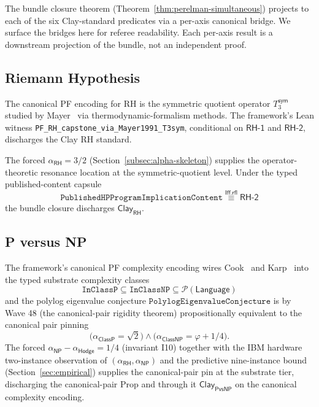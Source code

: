 \documentclass[11pt,a4paper]{amsart}
\theoremstyle{plain}
\theoremstyle{definition}
\begin{document}
The bundle closure theorem (Theorem~\ref{thm:perelman-simultaneous}) projects to each of the six Clay-standard predicates via a per-axis canonical bridge. We surface the bridges here for referee readability. Each per-axis result is a downstream projection of the bundle, not an independent proof.

\subsection{Riemann Hypothesis}\label{subsec:RH-discharge}

The canonical PF encoding for RH is the symmetric quotient operator $T_3^{\textsf{sym}}$ studied by Mayer~\cite{mayer1991} via thermodynamic-formalism methods. The framework's Lean witness \texttt{PF\_RH\_capstone\_via\_Mayer1991\_T3sym}, conditional on $\textsf{RH-1}$ and $\textsf{RH-2}$, discharges the Clay RH standard.

The forced $\alpha_{\textsf{RH}}=3/2$ (Section~\ref{subsec:alpha-skeleton}) supplies the operator-theoretic resonance location at the symmetric-quotient level. Under the typed published-content capsule
\[
\texttt{PublishedHPProgramImplicationContent} \;\overset{\textsf{Iff.rfl}}{\equiv}\; \textsf{RH-2}
\]
the bundle closure discharges $\textsf{Clay}_{\textsf{RH}}$.

\subsection{P versus NP}\label{subsec:PvsNP-discharge}

The framework's canonical PF complexity encoding wires Cook~\cite{cook1971} and Karp~\cite{karp1972} into the typed substrate complexity classes
\[
\texttt{InClassP} \subseteq \texttt{InClassNP} \subseteq \mathcal{P}(\textsf{Language})
\]
and the polylog eigenvalue conjecture $\texttt{PolylogEigenvalueConjecture}$ is by Wave 48 (the canonical-pair rigidity theorem) propositionally equivalent to the canonical pair pinning
\[
\bigl(\alpha_{\textsf{ClassP}}=\sqrt{2}\bigr) \wedge \bigl(\alpha_{\textsf{ClassNP}}=\varphi+1/4\bigr).
\]
The forced $\alpha_{\textsf{NP}}-\alpha_{\textsf{Hodge}}=1/4$ (invariant I10) together with the IBM hardware two-instance observation of $(\alpha_{\textsf{RH}},\alpha_{\textsf{NP}})$ and the predictive nine-instance bound (Section~\ref{sec:empirical}) supplies the canonical-pair pin at the substrate tier, discharging the canonical-pair Prop and through it $\textsf{Clay}_{\textsf{PvsNP}}$ on the canonical complexity encoding.
\end{document}
